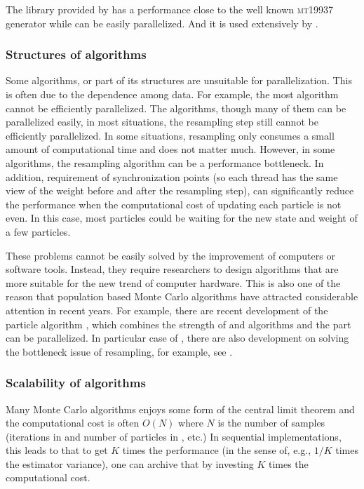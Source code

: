 The library provided by \cite{Salmon:2011um} has a performance close to
the well known \textsc{mt19937} generator while can be easily parallelized.
And it is used extensively by \vsmc.

\subsubsection{Structures of algorithms}
\label{ssub:Structures of algorithms}

Some algorithms, or part of its structures are unsuitable for parallelization.
This is often due to the dependence among data. For example, the most \mcmc
algorithm cannot be efficiently parallelized. The \smc algorithms, though many
of them can be parallelized easily, in most situations, the resampling step
still cannot be efficiently parallelized. In some situations, resampling only
consumes a small amount of computational time and does not matter much.
However, in some algorithms, the resampling algorithm can be a performance
bottleneck. In addition, requirement of synchronization points (so each
thread has the same view of the weight before and after the resampling step),
can significantly reduce the performance when the computational cost of
updating each particle is not even. In this case, most particles could be
waiting for the new state and weight of a few particles.

These problems cannot be easily solved by the improvement of computers or
software tools. Instead, they require researchers to design algorithms that
are more suitable for the new trend of computer hardware. This is also one of
the reason that population based Monte Carlo algorithms have attracted
considerable attention in recent years. For example, there are recent
development of the particle \mcmc algorithm \cite{Andrieu:2010gc}, which
combines the strength of \mcmc and \smc algorithms and the \smc part can be
parallelized. In particular case of \smc, there are also development on
solving the bottleneck issue of resampling, for example, see
\cite{presampling}.

\subsubsection{Scalability of algorithms}
\label{ssub:Scalability of algorithms}

Many Monte Carlo algorithms enjoys some form of the central limit theorem and
the computational cost is often $O(N)$ where $N$ is the number of samples
(iterations in \mcmc and number of particles in \smc, etc.) In sequential
implementations, this leads to that to get $K$ times the performance (in the
sense of, e.g., $1/K$ times the estimator variance), one can archive that by
investing $K$ times the computational cost.

